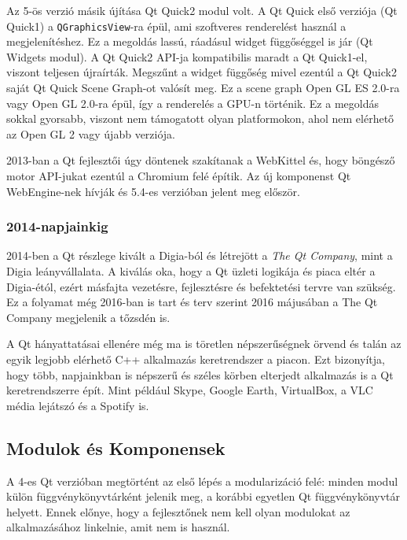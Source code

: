 \documentclass[12pt]{report}
\begin{document}
Az 5-ös verzió másik újítása Qt Quick2 modul volt. A Qt Quick első verziója (Qt Quick1) a
\texttt{QGraphicsView}-ra épül, ami szoftveres renderelést használ a megjelenítéshez.
Ez a megoldás lassú, ráadásul widget függőséggel is jár (Qt Widgets modul).
A Qt Quick2 API-ja kompatibilis maradt a Qt Quick1-el, viszont teljesen újraírták.
Megszűnt a widget függőség mivel ezentúl a Qt Quick2 saját Qt Quick Scene Graph-ot valósít
meg. Ez a scene graph Open GL ES 2.0-ra vagy Open GL 2.0-ra épül, így a renderelés a GPU-n
történik. Ez a megoldás sokkal gyorsabb, viszont nem támogatott olyan platformokon, ahol
nem elérhető az Open GL 2 vagy újabb verziója.

2013-ban a Qt fejlesztői úgy döntenek szakítanak a WebKittel és, hogy böngésző motor
API-jukat ezentúl a Chromium felé építik. \cite{bib:qt-blog-introducing-qtwebengine}
Az új komponenst Qt WebEngine-nek hívják és 5.4-es verzióban jelent meg először.
\cite{bib:qt-wiki-qt-history}

\subsubsection{2014-napjainkig}
2014-ben a Qt részlege kivált a Digia-ból és létrejött a \textit{The Qt Company},
mint a Digia leányvállalata. A kiválás oka, hogy a Qt üzleti logikája és piaca eltér a
Digia-étól, ezért másfajta vezetésre, fejlesztésre és befektetési tervre van szükség.
Ez a folyamat még 2016-ban is tart és terv szerint 2016 májusában a The Qt Company megjelenik
a tőzsdén is.
\cite{bib:qt-about-us}

A Qt hányattatásai ellenére még ma is töretlen népszerűségnek örvend és talán az egyik
legjobb elérhető C++ alkalmazás keretrendszer a piacon. Ezt bizonyítja,
hogy több, napjainkban is népszerű és széles körben elterjedt alkalmazás is a
Qt keretrendszerre épít. Mint például Skype, Google Earth, VirtualBox,
a VLC média lejátszó és a Spotify is.

\subsection{Modulok és Komponensek}
A 4-es Qt verzióban megtörtént az első lépés a modularizáció felé: minden modul külön
függvénykönyvtárként jelenik meg, a korábbi egyetlen Qt függvénykönyvtár helyett.
Ennek előnye, hogy a fejlesztőnek nem kell olyan modulokat az alkalmazásához linkelnie,
amit nem is használ.
\end{document}
